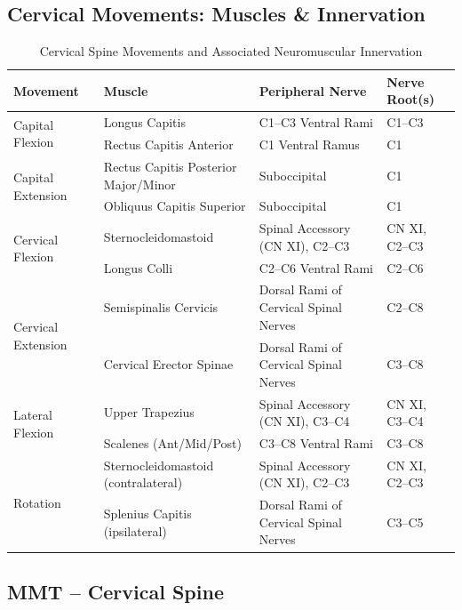 \subsection*{Cervical Movements: Muscles \& Innervation}

\begin{table}[H]
\centering
\captionsetup{justification=raggedright, singlelinecheck=false}
\begin{tabular}{|p{4cm}|p{5cm}|p{4cm}|p{2.5cm}|}
\hline
\textbf{Movement} & \textbf{Muscle} & \textbf{Peripheral Nerve} & \textbf{Nerve Root(s)} \\
\hline
\multirow{2}{*}{Capital Flexion}
  & Longus Capitis & C1–C3 Ventral Rami & C1–C3 \\
  & Rectus Capitis Anterior & C1 Ventral Ramus & C1 \\
\hline
\multirow{2}{*}{Capital Extension}
  & Rectus Capitis Posterior Major/Minor & Suboccipital & C1 \\
  & Obliquus Capitis Superior & Suboccipital & C1 \\
\hline
\multirow{2}{*}{Cervical Flexion}
  & Sternocleidomastoid & Spinal Accessory (CN XI), C2–C3 & CN XI, C2–C3 \\
  & Longus Colli & C2–C6 Ventral Rami & C2–C6 \\
\hline
\multirow{2}{*}{Cervical Extension}
  & Semispinalis Cervicis & Dorsal Rami of Cervical Spinal Nerves & C2–C8 \\
  & Cervical Erector Spinae & Dorsal Rami of Cervical Spinal Nerves & C3–C8 \\
\hline
\multirow{2}{*}{Lateral Flexion}
  & Upper Trapezius & Spinal Accessory (CN XI), C3–C4 & CN XI, C3–C4 \\
  & Scalenes (Ant/Mid/Post) & C3–C8 Ventral Rami & C3–C8 \\
\hline
\multirow{2}{*}{Rotation}
  & Sternocleidomastoid (contralateral) & Spinal Accessory (CN XI), C2–C3 & CN XI, C2–C3 \\
  & Splenius Capitis (ipsilateral) & Dorsal Rami of Cervical Spinal Nerves & C3–C5 \\
\hline
\end{tabular}
\caption{Cervical Spine Movements and Associated Neuromuscular Innervation}
\end{table}

\subsection*{MMT – Cervical Spine}

